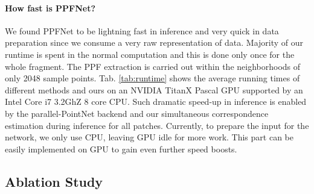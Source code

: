 \documentclass[10pt,twocolumn,letterpaper]{article}
\theoremstyle{break}
\begin{document}
\paragraph{How fast is PPFNet?}
We found PPFNet to be lightning fast in inference and very quick in data preparation since we consume a very raw representation of data. Majority of our runtime is spent in the normal computation and this is done only once for the whole fragment. The PPF extraction is carried out within the neighborhoods of only 2048 sample points. Tab. \ref{tab:runtime} shows the average running times of different methods and ours on an NVIDIA TitanX Pascal GPU supported by an Intel Core i7 3.2GhZ 8 core CPU. Such dramatic speed-up in inference is enabled by the parallel-PointNet backend and our simultaneous correspondence estimation during inference for all patches. Currently, to prepare the input for the network, we only use CPU, leaving GPU idle for more work. This part can be easily implemented on GPU to gain even further speed boosts.
\subsection{Ablation Study}
\end{document}
